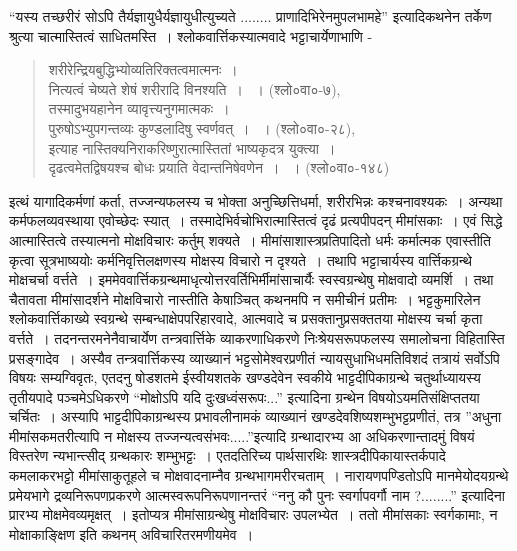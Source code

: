 {“यस्य तच्छरीरं सोऽपि तैर्यज्ञायुधैर्यज्ञायुधीत्युच्यते ........ प्राणादिभिरेनमुपलभामहे” इत्यादिकथनेन तर्केण श्रुत्या चात्मास्तित्वं साधितमस्ति~। श्लोकवार्त्तिकस्यात्मवादे भट्टाचार्येणाभाणि - 
\begin{verse}
शरीरेन्द्रियबुद्धिभ्योव्यतिरिक्तत्वमात्मनः~। \\
नित्यत्वं चेष्यते शेषं शरीरादि विनश्यति~। ~। (श्लो०वा०-७),\\
तस्मादुभयहानेन व्यावृत्त्यनुगमात्मकः~। \\
पुरुषोऽभ्युपगन्तव्यः कुण्डलादिषु स्वर्णवत्~। ~। (श्लो०वा०-२८), \\
इत्याह नास्तिक्यनिराकरिष्णुरात्मास्तितां भाष्यकृदत्र युक्त्या~। \\ 
दृढत्वमेतद्विषयश्च बोधः प्रयाति वेदान्तनिषेवणेन~। ~। (श्लो०वा०-१४८) 
\end{verse}
इत्थं यागादिकर्मणां कर्ता, तज्जन्यफलस्य च भोक्ता अनुच्छित्तिधर्मा, शरीरभिन्नः कश्चनावश्यकः~। अन्यथा कर्मफलव्यवस्थाया एवोच्छेदः स्यात्~। तस्मादेभिर्वचोभिरात्मास्तित्वं दृढं प्रत्यपीपदन् मीमांसकाः~। एवं सिद्धे आत्मास्तित्वे तस्यात्मनो मोक्षविचारः कर्तुम् शक्यते~। मीमांसाशास्त्रप्रतिपादितो धर्मः कर्मात्मक एवास्तीति कृत्वा सूत्रभाष्ययोः कर्मनिवृत्तिलक्षणस्य मोक्षस्य विचारो न दृश्यते~। तथापि भट्टाचार्यस्य वार्त्तिकग्रन्थे मोक्षचर्चा वर्त्तते~। इममेववार्त्तिकग्रन्थमाधृत्योत्तरवर्तिभिर्मीमांसाचार्यैः स्वस्वग्रन्थेषु मोक्षवादो व्यमर्शि~। तथा चैतावता मीमांसादर्शने मोक्षविचारो नास्तीति केेषाञ्चित् कथनमपि न समीचीनं प्रतीमः~। भट्टकुमारिलेन श्लोकवार्त्तिकाख्ये स्वग्रन्थे सम्बन्धाक्षेपपरिहारवादे, आत्मवादे च प्रसक्तानुप्रसक्ततया मोक्षस्य चर्चा कृता वर्त्तते~। 	तदनन्तरमनेनैवाचार्येण तन्त्रवार्त्तिके व्याकरणाधिकरणे निःश्रेयसरूपफलस्य समालोचना विहितास्ति प्रसङ्गादेव~। अस्यैव तन्त्रवार्त्तिकस्य व्याख्यानं भट्टसोमेश्वरप्रणीतं न्यायसुधाभिधमतिविशदं तत्रायं सर्वोऽपि विषयः सम्यग्विवृतः, एतदनु षोडशतमे ईस्वीयशतके खण्डदेवेन स्वकीये भाट्टदीपिकाग्रन्थे चतुर्थाध्यायस्य तृतीयपादे पञ्चमेऽधिकरणे “मोक्षोऽपि यदि दुःखध्वंसरूपः...” इत्यादिना ग्रन्थेन विषयोऽयमतिसंक्षिप्ततया चर्चितः~। अस्यापि भाट्टदीपिकाग्रन्थस्य प्रभावलीनामकं व्याख्यानं खण्डदेवशिष्यशम्भुभट्टप्रणीतं, तत्र ”अधुना मीमांसकमतरीत्यापि न मोक्षस्य तज्जन्यत्वसंभवः.....”इत्यादि ग्रन्थादारभ्य आ अधिकरणान्तादमुं विषयं विस्तरेण न्यभान्त्सीद् ग्रन्थकारः शम्भुभट्टः~। एतदतिरिच्य पार्थसारथिः शास्त्रदीपिकायास्तर्कपादे कमलाकरभट्टो  मीमांसाकुतूहले च मोक्षवादनाम्नैव ग्रन्थभागमरीरचताम्~। नारायणपण्डितोऽपि मानमेयोदयग्रन्थे प्रमेयभागे द्रव्यनिरूपणप्रकरणे आत्मस्वरूपनिरूपणानन्तरं “ननु कौ पुनः स्वर्गापवर्गौ नाम ?........” इत्यादिना प्रारभ्य मोक्षमेवव्यमृक्षत्~। इतोप्यत्र मीमांसाग्रन्थेषु मोक्षविचारः उपलभ्येत~। ततो मीमांसकाः स्वर्गकामाः, न मोक्षाकाङ्क्षिण इति कथनम् अविचारितरमणीयमेव~। 

}
